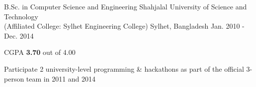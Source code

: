 

\begin{cventries}

  \cventry
    {B.Sc. in Computer Science and Engineering} %
    {Shahjalal University of Science and Technology\\(Affiliated College: Sylhet Engineering College)} %
    {Sylhet, Bangladesh} %
    {Jan. 2010 - Dec. 2014} %
    {
      \begin{cvitems} %
        \item {CGPA \textbf{3.70} out of 4.00}
        \item {Participate 2 university-level programming \& hackathons as part of the official 3-person team in 2011 and 2014}
      \end{cvitems}
    }

\end{cventries}
